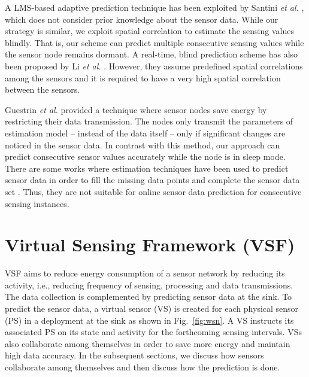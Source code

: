 \documentclass[a4paper,conference]{IEEEtran}
\begin{document}
A LMS-based adaptive prediction technique has been exploited by Santini {\it et al.} \cite{santini2006adaptive}, which does not consider prior knowledge about the sensor data. While our strategy is similar, we exploit spatial correlation to estimate the sensing values blindly. That is, our scheme can predict multiple consecutive sensing values while the sensor node remains dormant. A real-time, blind prediction scheme has also been proposed by Li {\it et al.} \cite{Li2008}. However, they assume predefined spatial correlations among the sensors and it is required to have a very high spatial correlation between the sensors. 

Guestrin {\it et al.} \cite{Guestrin2004} provided a technique where sensor nodes save energy by restricting their data transmission. The nodes only transmit the parameters of estimation model -- instead of the data itself -- only if significant changes are noticed in the sensor data. In contrast with this method, our approach can predict consecutive sensor values accurately while the node is in sleep mode. There are some works where estimation techniques have been used to predict sensor data in order to fill the missing data points and complete the sensor data set \cite{Pan2010}. Thus, they are not suitable for online sensor data prediction for consecutive sensing instances.

\section{Virtual Sensing Framework (VSF)}
\label{sec:vsp}
VSF aims to reduce energy consumption of a sensor network by reducing its activity, i.e., reducing frequency of sensing, processing and data transmissions. The data collection is complemented by predicting sensor data at the sink. To predict the sensor data, a virtual sensor (VS) is created for each physical sensor (PS) in a deployment at the sink as shown in Fig.~\ref{fig:wsn}. A VS instructs its associated PS on its state and activity for the forthcoming sensing intervals. VSs also collaborate among themselves in order to save more energy and maintain high data accuracy. In the subsequent sections, we discuss how sensors collaborate among themselves and then discuss how the prediction is done.
\end{document}

